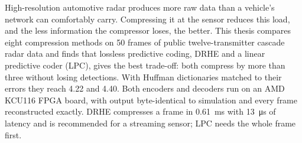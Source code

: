 High-resolution automotive radar produces more raw data than a vehicle's
network can comfortably carry. Compressing it at the sensor reduces this load,
and the less information the compressor loses, the better. This thesis
compares eight compression methods on 50 frames of public twelve-transmitter
cascade radar data and finds that lossless predictive coding, DRHE and a linear
predictive coder (LPC), gives the best trade-off: both compress by more than
three without losing detections. With Huffman dictionaries matched to their
errors they reach \num{4.22} and \num{4.40}. Both encoders and decoders run on
an AMD KCU116 FPGA board, with output byte-identical to simulation and every
frame reconstructed exactly. DRHE compresses a frame in
\SI{0.61}{\milli\second} with \SI{13}{\micro\second} of latency and is
recommended for a streaming sensor; LPC needs the whole frame first.
